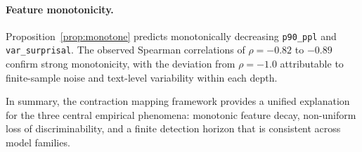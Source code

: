 \paragraph{Feature monotonicity.}
Proposition~\ref{prop:monotone} predicts monotonically decreasing \texttt{p90\_ppl} and \texttt{var\_surprisal}. The observed Spearman correlations of $\rho = -0.82$ to $-0.89$ confirm strong monotonicity, with the deviation from $\rho = -1.0$ attributable to finite-sample noise and text-level variability within each depth.

In summary, the contraction mapping framework provides a unified explanation for the three central empirical phenomena: monotonic feature decay, non-uniform loss of discriminability, and a finite detection horizon that is consistent across model families.
